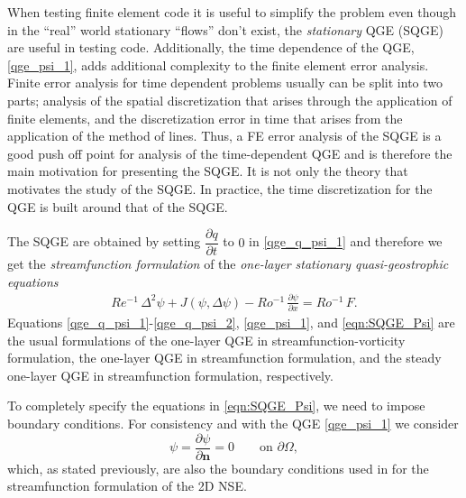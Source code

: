 When testing finite element code it is useful to simplify the problem even
though in the ``real'' world stationary ``flows'' don't exist, the
\emph{stationary} QGE (SQGE) are useful in testing code.  Additionally, the time
dependence of the QGE, \eqref{qge_psi_1}, adds additional complexity to the
finite element error analysis. Finite error analysis for time dependent problems
usually can be split into two parts; analysis of the spatial discretization that
arises through the application of finite elements, and the discretization error
in time that arises from the application of the method of lines. Thus, a FE
error analysis of the SQGE is a good push off point for analysis of the
time-dependent QGE and is therefore the main motivation for presenting the SQGE.
It is not only the theory that motivates the study of the SQGE. In practice, the
time discretization for the QGE is built around that of the SQGE.

The SQGE are obtained by setting $\dfrac{\partial q}{\partial t}$ to $0$ in
\eqref{qge_q_psi_1} and therefore we get the \emph{streamfunction formulation}
of the \emph{one-layer stationary quasi-geostrophic equations}
\begin{eqnarray}
  Re^{-1} \, \Delta^2 \psi + J(\psi , \Delta \psi) - Ro^{-1} \, \frac{\partial
    \psi}{\partial x} = Ro^{-1} \, F .
  \label{eqn:SQGE_Psi}
\end{eqnarray}
Equations \eqref{qge_q_psi_1}-\eqref{qge_q_psi_2}, \eqref{qge_psi_1}, and
\eqref{eqn:SQGE_Psi} are the usual formulations of the one-layer QGE in
streamfunction-vorticity formulation, the one-layer QGE in streamfunction
formulation, and the steady one-layer QGE in streamfunction formulation,
respectively.

To completely specify the equations in \eqref{eqn:SQGE_Psi}, we need to impose
boundary conditions. For consistency and with the QGE \eqref{qge_psi_1}  we
consider
\begin{equation*}
  \psi = \frac{\partial \psi}{\partial \mathbf{n}} = 0 \qquad \text{on } \partial \Omega,
\end{equation*}
which, as stated previously, are also the boundary conditions used in
\cite{Gunzburger89} for the streamfunction formulation of the 2D NSE.

